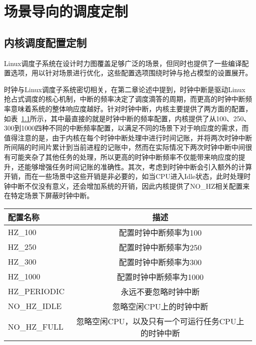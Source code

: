 \chapter{场景导向的调度定制}\label{chap:sched_policy}

\section{内核调度配置定制}

Linux调度子系统在设计时力图覆盖足够广泛的场景，但同时也提供了一些编译配置选项，用以针对场景进行优化，这些配置选项围绕时钟与抢占模型的设置展开。

时钟与Linux调度子系统密切相关，在第二章论述中提到，时钟中断是驱动Linux抢占式调度的核心机制，中断的频率决定了调度滴答的周期，而更高的时钟中断频率意味着系统的整体响应度越好。针对时钟中断，内核主要提供了两方面的配置，如表~\ref{tab:config_hz}所示，其中最直接的就是时钟中断的频率配置，内核提供了从100、250、300到1000四种不同的中断频率配置，以满足不同的场景下对于响应度的需求，而值得注意的是，由于内核在每个时钟中断处理中进行时间记账，并将两次时钟中断所间隔的时间片累计到当前进程的记账中，然而在实际情况下两次时钟中断中间很有可能夹杂了其他任务的处理，所以更高的时钟中断频率不仅能带来响应度的提升，还能够增强任务时间记账的准确性。其次，考虑到时钟中断会引入额外的计算开销，而在一些场景中这些开销是非必要的，如当CPU进入Idle状态，此时处理时钟中断不仅没有意义，还会增加系统的开销，因此内核提供了NO\_HZ相关配置来在特定场景下屏蔽时钟中断。

\begin{table}
    \label{tab:config_hz}
    \footnotesize%
    \setlength{\tabcolsep}{4pt}%
    \renewcommand{\arraystretch}{1.5}%
    \centering
    \begin{tabular}{lc}
        \hline
        配置名称 & 描述 \\
        \hline
        HZ\_100  & 配置时钟中断频率为100  \\
        HZ\_250  & 配置时钟中断频率为250 \\
        HZ\_300  & 配置时钟中断频率为300 \\
        HZ\_1000 & 配置时钟中断频率为1000 \\
        HZ\_PERIODIC & 永远不要忽略时钟中断 \\
        NO\_HZ\_IDLE & 忽略空闲CPU上的时钟中断 \\
        NO\_HZ\_FULL & 忽略空闲CPU，以及只有一个可运行任务CPU上的时钟中断 \\
        \hline
    \end{tabular}
\end{table}

